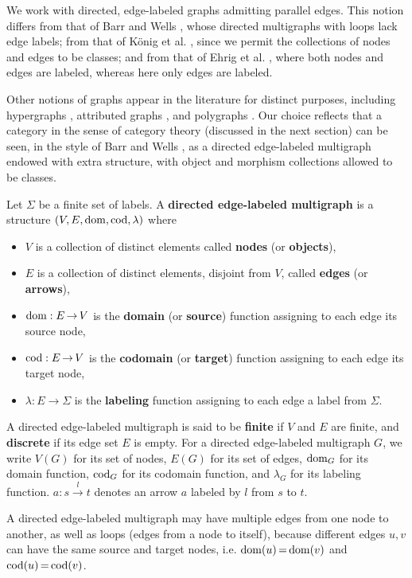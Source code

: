 We work with directed, edge-labeled graphs admitting parallel edges. This notion differs from that of Barr and Wells \cite{barr1990category}, whose directed multigraphs with loops lack edge labels; from that of König et al. \cite{konig2018atutorial}, since we permit the collections of nodes and edges to be classes; and from that of Ehrig et al. \cite{ehrig1997handbook1}, where both nodes and edges are labeled, whereas here only edges are labeled.

Other notions of graphs appear in the literature for distinct purposes, including hypergraphs \cite{plump1993hypergraph}, attributed graphs \cite{ehrig2006fundamentals}, and polygraphs \cite{ara2023polygraphs}. Our choice reflects that a category in the sense of category theory (discussed in the next section) can be seen, in the style of Barr and Wells \cite{barr1990category}, as a directed edge-labeled multigraph endowed with extra structure, with object and morphism collections allowed to be classes.

\begin{definition}
    \label{def:graph}
     Let \(\Sigma\) be a finite set of labels. A \textbf{directed edge-labeled multigraph} is a structure \((V, E, \operatorname{dom}, \operatorname{cod},\lambda)\) where
    \begin{itemize}
        \item $V$ is a collection of distinct elements called \textbf{nodes} (or \textbf{objects}),
        \item $E$ is a collection of distinct elements, disjoint from $V$, called \textbf{edges} (or \textbf{arrows}),
        \item $\operatorname{dom}: E \mathop{\to} V$ is the \textbf{domain} (or \textbf{source}) function assigning to each edge its source node,
        \item $\operatorname{cod}: E \mathop{\to} V$ is the \textbf{codomain} (or \textbf{target}) function assigning to each edge its target node,
        \item $\lambda: E \mathop{\to} \Sigma$ is the \textbf{labeling} function assigning to each edge a label from $\Sigma$.
    \end{itemize}
    A directed edge-labeled multigraph is said to be \textbf{finite} if $V$ and $E$ are finite, and \textbf{discrete} if its edge set \(E\) is empty.
    For a directed edge-labeled multigraph \( G \), we write \( V(G) \) for its set of nodes, \( E(G) \) for its set of edges, \( \operatorname{dom}_G \) for its domain function, \( \operatorname{cod}_G \) for its codomain function, and \( \lambda_G \) for its labeling function. $a : s\overset{l}{\rightarrow} t$ denotes an arrow $a$ labeled by $l$ from $s$ to $t$.
\end{definition}
A directed edge-labeled multigraph may have multiple edges from one node to another, as well as loops (edges from a node to itself), because different edges $u,v$ can have the same source and target nodes, i.e. $\operatorname{dom}(u) \mathop{=} \operatorname{dom}(v)$ and $\operatorname{cod}(u) \mathop{=} \operatorname{cod}(v)$.

